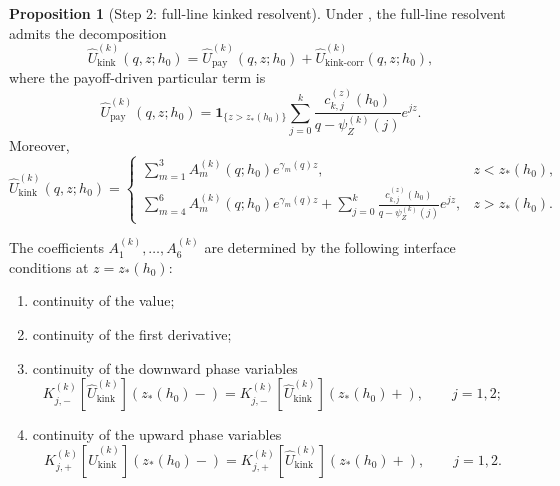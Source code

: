 \documentclass{article}
\newcommand{\one}{\mathbf{1}}
\theoremstyle{definition}
\newtheorem{proposition}{Proposition}[section]
\begin{document}
\begin{proposition}[Step 2: full-line kinked resolvent]\label{prop:Ukink}
Under , the full-line resolvent admits the decomposition
\[
\widehat U_{\mathrm{kink}}^{(k)}(q,z;h_0)
=
\widehat U_{\mathrm{pay}}^{(k)}(q,z;h_0)
+
\widehat U_{\mathrm{kink\text{-}corr}}^{(k)}(q,z;h_0),
\]
where the payoff-driven particular term is
\[
\boxed{
\widehat U_{\mathrm{pay}}^{(k)}(q,z;h_0)
=
\one_{\{z>z_*(h_0)\}}
\sum_{j=0}^{k}
\frac{c_{k,j}^{(z)}(h_0)}{q-\psi_Z^{(k)}(j)}e^{jz}.
}
\]
Moreover,
\[
\boxed{
\widehat U_{\mathrm{kink}}^{(k)}(q,z;h_0)=
\begin{cases}
\displaystyle \sum_{m=1}^3 A_m^{(k)}(q;h_0)e^{\gamma_m(q)z}, & z<z_*(h_0),\\[10pt]
\displaystyle \sum_{m=4}^6 A_m^{(k)}(q;h_0)e^{\gamma_m(q)z}
+\sum_{j=0}^{k}\frac{c_{k,j}^{(z)}(h_0)}{q-\psi_Z^{(k)}(j)}e^{jz}, & z>z_*(h_0).
\end{cases}
}
\]

The coefficients $A_1^{(k)},\dots,A_6^{(k)}$ are determined by the following interface conditions at $z=z_*(h_0)$:
\begin{enumerate}[label=(\roman*),leftmargin=2em]
\item continuity of the value;
\item continuity of the first derivative;
\item continuity of the downward phase variables
\[
K_{j,-}^{(k)}[\widehat U_{\mathrm{kink}}^{(k)}](z_*(h_0)-)
=
K_{j,-}^{(k)}[\widehat U_{\mathrm{kink}}^{(k)}](z_*(h_0)+),
\qquad j=1,2;
\]
\item continuity of the upward phase variables
\[
K_{j,+}^{(k)}[\widehat U_{\mathrm{kink}}^{(k)}](z_*(h_0)-)
=
K_{j,+}^{(k)}[\widehat U_{\mathrm{kink}}^{(k)}](z_*(h_0)+),
\qquad j=1,2.
\]
\end{enumerate}


\end{proposition}
\end{document}
